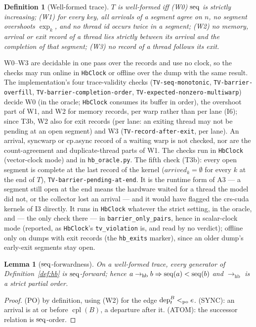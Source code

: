 \documentclass[11pt]{article}
\newtheorem{lemma}[theorem]{Lemma}
\newtheorem{definition}[theorem]{Definition}
\theoremstyle{remark}
\DeclareMathOperator{\cpl}{cpl}\DeclareMathOperator{\Exec}{Exec}\DeclareMathOperator{\rf}{rf}
\newcommand{\PO}{<_{\mathrm{po}}}\newcommand{\HB}{\to_{\mathrm{hb}}}\newcommand{\HBr}{\trianglelefteq_{\mathrm{hb}}}
\newcommand{\arrv}{\mathit{arrived}}\newcommand{\gone}{\mathit{exited}}\newcommand{\Rep}{\mathit{Rep}}
\begin{document}
\begin{definition}[Well-formed trace]\label{def:wf}
$T$ is well-formed iff (W0) $\operatorname{seq}$ is strictly increasing; (W1) for every key, all
arrivals of a segment agree on $n$, no segment overshoots $\exp_k$, and no thread id occurs
twice in a segment; (W2) no memory, arrival or exit record of a thread lies strictly between
its arrival and the completion of that segment; (W3) no record of a thread follows its exit.
\end{definition}
W0--W3 are decidable in one pass over the records and use no clock, so the checks may
run online in \texttt{HbClock} or offline over the dump with the same result. The
implementation's four trace-validity checks (\texttt{TV-seq-monotonic},
\texttt{TV-barrier-overfill}, \texttt{TV-barrier-completion-order},
\texttt{TV-expected-nonzero-multiwarp}) decide W0 (in the oracle; \texttt{HbClock} consumes its
buffer in order), the overshoot part of W1, and W2 for memory records, per warp rather than
per lane (I6); since T3b, W2 also for exit records (per lane: an exiting thread may not be
pending at an open segment) and W3 (\texttt{TV-record-after-exit}, per lane). An arrival,
syncwarp or cp.async record of a waiting warp is not checked, nor are the count-agreement
and duplicate-thread parts of W1. The checks run in \texttt{HbClock} (vector-clock mode) and in
\texttt{hb\_oracle.py}. The fifth check (T3b): every open segment is complete at the last
record of the kernel ($\arrv_k=\emptyset$ for every $k$ at the end of $T$),
\texttt{TV-barrier-pending-at-end}. It is the runtime form of A3 --- a segment still open at
the end means the hardware waited for a thread the model did not, or the collector lost an
arrival --- and it would have flagged the crs-cuda kernels of I3 directly. It runs in
\texttt{HbClock} whatever the strict setting, in the oracle, and --- the only check there --- in
\texttt{barrier\_only\_pairs}, hence in scalar-clock mode (reported, as \texttt{HbClock}'s
\texttt{tv\_violation} is, and read by no verdict); offline only on dumps with exit records
(the \texttt{hb\_exits} marker), since an older dump's early-exit segments stay open.

\begin{lemma}[$\operatorname{seq}$-forwardness]\label{lem:seq}
On a well-formed trace, every generator of Definition~\ref{def:hb} is $\operatorname{seq}$-forward; hence
$a\HB b\Rightarrow\seq(a)<\seq(b)$ and $\HB$ is a strict partial order.
\end{lemma}
\begin{proof}
(PO) by definition, using (W2) for the edge $\dep{t}{B}\PO e$. (SYNC): an arrival is at or
before $\cpl(B)$, a departure after it. (ATOM): the successor relation is $\operatorname{seq}$-order.
\end{proof}
\end{document}
